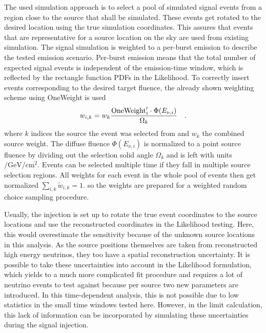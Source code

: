 The used simulation approach is to select a pool of simulated signal events from a region close to the source that shall be simulated.
These events get rotated to the desired location using the true simulation coordinates.
This assures that events that are representative for a source location on the sky are used from existing simulation.
The signal simulation is weighted to a per-burst emission to describe the tested emission scenario.
Per-burst emission means that the total number of expected signal events is independent of the emission-time window, which is reflected by the rectangle function PDFs in the Likelihood.
To correctly insert events corresponding to the desired target fluence, the already shown weighting scheme using OneWeight is used
\begin{equation}
  \label{equ:sig_inj_weights}
  w_{i,k} = w_k \frac{\text{OneWeight}'_i \cdot \Phi(E_{\nu,i})}{\Omega_k}
  \quad\text{.}
\end{equation}
where $k$ indices the source the event was selected from and $w_k$ the combined source weight.
The diffuse fluence $\Phi(E_{\nu,i})$ is normalized to a point source fluence by dividing out the selection solid angle $\Omega_k$ and is left with units $\si{\per\GeV\per\cm\squared}$.
Events can be selected multiple time if they fall in multiple source selection regions.
All weights for each event in the whole pool of events then get normalized $\sum_{i,k}\tilde{w}_{i,k} = 1$. so the weights are prepared for a weighted random choice sampling procedure.

Usually, the injection is set up to rotate the true event coordinates to the source locations and use the reconstructed coordinates in the Likelihood testing.
Here, this would overestimate the sensitivity because of the unknown source locations in this analysis.
As the source positions themselves are taken from reconstructed high energy neutrinos, they too have a spatial reconstruction uncertainty.
It is possible to take these uncertainties into account in the Likelihood formulation, which yields to a much more complicated fit procedure and requires a lot of neutrino events to test against because per source two new parameters are introduced.
In this time-dependent analysis, this is not possible due to low statistics in the small time windows tested here.
However, in the limit calculation, this lack of information can be incorporated by simulating these uncertainties during the signal injection.


